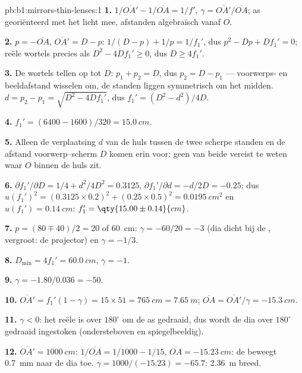 \begin{solution}{pb:b1:mirrors-thin-lenses:1}
\textbf{1.} $1/\overline{OA'} - 1/\overline{OA} = 1/f'$,
$\gamma = \overline{OA'}/\overline{OA}$; as georiënteerd met het licht mee,
afstanden algebraïsch vanaf $O$.

\textbf{2.} $p = -\overline{OA}$, $\overline{OA'} = D - p$:
$1/(D - p) + 1/p = 1/f_1'$, dus $p^2 - Dp + Df_1' = 0$; reële wortels precies als
$D^2 - 4Df_1' \geq 0$, dus $D \geq 4f_1'$.

\textbf{3.} De wortels tellen op tot $D$: $p_1 + p_2 = D$, dus $p_2 = D - p_1$ ---
voorwerps- en beeldafstand wisselen om, de standen liggen symmetrisch om het
midden. $d = p_2 - p_1 = \sqrt{D^2 - 4Df_1'}$, dus $f_1' = (D^2 -
d^2)/4D$.

\textbf{4.} $f_1' = (6400 - 1600)/320 = \qty{15.0}{cm}$.

\textbf{5.} Alleen de verplaatsing $d$ van de huls tussen de twee scherpe
standen en de afstand voorwerp--scherm $D$ komen erin voor: geen van beide
vereist te weten waar $O$ binnen de huls zit.

\textbf{6.} $\partial f_1'/\partial D = 1/4 + d^2/4D^2 = 0.3125$,
$\partial f_1'/\partial d = -d/2D = -0.25$; dus
$u(f_1')^2 = (0.3125 \times 0.2)^2 + (0.25 \times 0.5)^2 =
\qty{0.0195}{cm^2}$ en $u(f_1') = \qty{0.14}{cm}$:
$f_1' = \qty{15.00\pm0.14}{cm}$.

\textbf{7.} $p = (80 \mp 40)/2 = 20$ of \qty{60}{cm}: $\gamma =
-60/20 = -3$ (dia dicht bij de , vergroot: de projector) en
$\gamma = -1/3$.

\textbf{8.} $D_{\min} = 4f_1' = \qty{60.0}{cm}$, $\gamma = -1$.

\textbf{9.} $\gamma = -1.80/0.036 = -50$.

\textbf{10.} $\overline{OA'} = f_1'(1 - \gamma) = 15 \times 51 =
\qty{765}{cm} = \qty{7.65}{m}$; $\overline{OA} = \overline{OA'}/\gamma =
\qty{-15.3}{cm}$.

\textbf{11.} $\gamma < 0$: het reële  is over $180^\circ$ om de as
gedraaid, dus wordt de dia over $180^\circ$ gedraaid ingestoken (ondersteboven
en spiegelbeeldig).

\textbf{12.} $\overline{OA'} = \qty{1000}{cm}$: $1/\overline{OA} = 1/1000
- 1/15$, $\overline{OA} = \qty{-15.23}{cm}$: de  beweegt \qty{0.7}{mm}
naar de dia toe. $\gamma = 1000/(-15.23) = -65.7$: 
\qty{2.36}{m} breed.


\end{solution}
